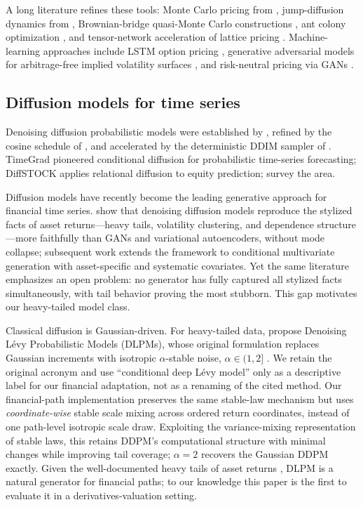 ﻿\documentclass[12pt,letterpaper]{article}
\begin{document}
A long literature refines these tools: Monte Carlo pricing from
\citet{boyle1977options}, jump-diffusion dynamics from
\citet{merton1976option}, Brownian-bridge quasi-Monte Carlo constructions
\citep{lin2008brownian}, ant colony optimization \citep{kumar2009aco}, and
tensor-network acceleration of lattice pricing \citep{vandamme2025tensor}.
Machine-learning approaches include LSTM option pricing
\citep{pimentel2025lstm}, generative adversarial models for arbitrage-free
implied volatility surfaces \citep{vuletic2025volgan}, and risk-neutral
pricing via GANs \citep{choi2025riskneutral}.

\subsection{Diffusion models for time series}

Denoising diffusion probabilistic models were established by
\citet{ho2020ddpm}, refined by the cosine schedule of
\citet{nichol2021improved}, and accelerated by the deterministic DDIM sampler
of \citet{song2020ddim}. TimeGrad \citep{rasul2021timegrad} pioneered
conditional diffusion for probabilistic time-series forecasting;
DiffSTOCK \citep{daiya2024diffstock} applies relational diffusion to equity
prediction; \citet{meijer2024rise} survey the area.

Diffusion models have recently become the leading generative approach for
financial time series. \citet{takahashi2025diffusion} show that denoising
diffusion models reproduce the stylized facts of asset
returns---heavy tails, volatility clustering, and dependence
structure---more faithfully than GANs and variational autoencoders, without
mode collapse; subsequent work extends the framework to conditional
multivariate generation with asset-specific and systematic covariates. Yet
the same literature emphasizes an open problem: no generator has fully
captured all stylized facts simultaneously, with tail behavior proving the
most stubborn. This gap motivates our heavy-tailed model class.

Classical diffusion is Gaussian-driven. For heavy-tailed data,
\citet{shariatian2024dlpm} propose Denoising L\'evy Probabilistic Models
(DLPMs), whose original formulation
replaces Gaussian increments with isotropic $\alpha$-stable noise,
$\alpha \in (1,2]$ \citep{samorodnitsky1994stable}. We retain the original
acronym and use ``conditional deep L\'evy model'' only as a descriptive label
for our financial adaptation, not as a renaming of the cited method. Our financial-path
implementation preserves the same stable-law mechanism but uses
\emph{coordinate-wise} stable scale mixing across ordered return coordinates,
instead of one path-level isotropic scale draw. Exploiting the variance-mixing
representation of stable laws, this retains DDPM's computational structure
with minimal changes while improving tail coverage; $\alpha = 2$ recovers the
Gaussian DDPM exactly. Given the well-documented heavy tails of asset returns
\citep{cont2001empirical}, DLPM is a natural generator for financial paths;
to our knowledge this paper is the first to evaluate it in a
derivatives-valuation setting.
\end{document}
